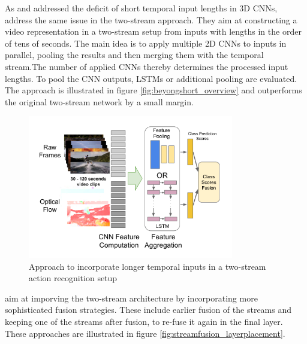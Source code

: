 As \textcite{baccouche_sequential_2011} and \textcite{varol_long-term_2016} addressed the deficit of short temporal input lengths in 3D CNNs, \textcite{ng_beyond_2015} address the same issue in the two-stream approach.
They aim at constructing a video representation in a two-stream setup from inputs with lengths in the order of tens of seconds.
The main idea is to apply multiple 2D CNNs to inputs in parallel, pooling the results and then merging them with the temporal stream.The number of applied CNNs thereby determines the processed input lengths.
To pool the CNN outputs, LSTMs or additional pooling are evaluated.
The approach is illustrated in figure \ref{fig:beyongshort_overview} and outperforms \textcite{simonyan_two-stream_2014} the original two-stream network by a small margin.

\begin{figure}[H]
    \centering
    \includegraphics[width=0.8\textwidth]{img_related/beyondshort_overview}
    \caption{Approach to incorporate longer temporal inputs in a two-stream action recognition setup \cite{ng_beyond_2015}}
    \label{fig:beyondshort_overview}
\end{figure}

\textcite{feichtenhofer_convolutional_2016} aim at imporving the two-stream architecture by incorporating more sophisticated fusion strategies.
These include earlier fusion of the streams and keeping one of the streams after fusion, to re-fuse it again in the final layer.
These approaches are illustrated in figure \ref{fig:streamfusion_layerplacement}.

